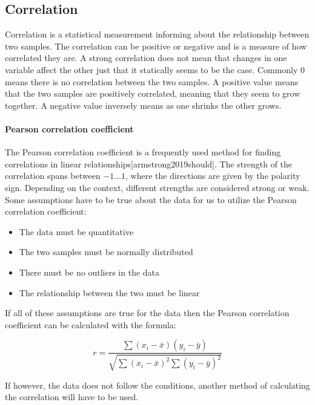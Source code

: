 \subsection{Correlation}
Correlation is a statistical measurement informing about the relationship between two samples. The correlation can be positive or negative and is a measure of how correlated they are. A strong correlation does not mean that changes in one variable affect the other just that it statically seems to be the case. Commonly $0$ means there is no correlation between the two samples. A positive value means that the two samples are positively correlated, meaning that they seem to grow together. A negative value inversely means as one shrinks the other grows.

\paragraph{Pearson correlation coefficient} The Pearson correlation coefficient is a frequently used method for finding correlations in linear relationships[armstrong2019should]. The strength of the correlation spans between $-1 \dotsc 1$, where the directions are given by the polarity sign. Depending on the context, different strengths are considered strong or weak. Some assumptions have to be true about the data for us to utilize the Pearson correlation coefficient:

\begin{itemize}
    \item The data must be quantitative
    \item The two samples must be normally distributed
    \item There must be no outliers in the data
    \item The relationship between the two must be linear
\end{itemize}

If all of these assumptions are true for the data then the Pearson correlation coefficient can be calculated with the formula:

\begin{equation}
    r=\frac{\sum{(x_i-\bar{x})(y_i-\bar{y})}}{\sqrt{\sum{(x_i-\bar{x})^2}\sum{(y_i-\bar{y})^2}}}
\end{equation}

If however, the data does not follow the conditions, another method of calculating the correlation will have to be used. 

